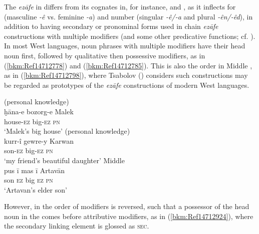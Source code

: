 \documentclass[output=paper]{langsci/langscibook}
\begin{document}
The \textit{ezāfe} in  differs from its cognates in, for instance,  and , as it inflects for  (masculine \textit{{}-ê} vs. feminine \textit{{}-a}) and number (singular \textit{{}-ê/-a} and plural \textit{{}-ên/-êd}), in addition to having secondary or pronominal forms used in chain \textit{ezāfe} constructions with multiple modifiers (and some other predicative functions; cf. \citealt{Haig2011,HaigÖpengin2018}). In most West  languages, noun phrases with multiple modifiers have their head noun first, followed by qualitative then possessive modifiers, as in (\ref{bkm:Ref14712778}) and (\ref{bkm:Ref14712785}). This is also the order in Middle , as in (\ref{bkm:Ref14712798}), where Tsabolov (\citeyear[122]{Tsabolov1994}) considers such constructions may be regarded as prototypes of the \textit{ezāfe} constructions of modern West  languages. 

\ea\label{bkm:Ref14712778} (personal knowledge)\\
\gll ḫāna-e bozorg-e Malek\\
     house-\textsc{ez} big-\textsc{ez} \textsc{pn}\\
\glt ‘Malek’s big house’
\ex \label{bkm:Ref14712785}\label{bkm:Ref14771780}  (personal knowledge)\\
\gll kurr-î gewre-y Karwan\\
     son-\textsc{ez} big-\textsc{ez} \textsc{pn}\\
\glt ‘my friend’s beautiful daughter’
\ex \label{bkm:Ref14712798}Middle  \citep[122]{Tsabolov1994}\\
\gll pus ī mas ī Artavān\\
     son \textsc{ez} big \textsc{ez} \textsc{pn}\\
\glt ‘Artavan’s elder son’
\z

However, in  the order of modifiers is reversed, such that a possessor of the head noun in the  comes before attributive modifiers, as in (\ref{bkm:Ref14712924}), where the secondary linking element is glossed as \textsc{sec}.  

\end{document}

